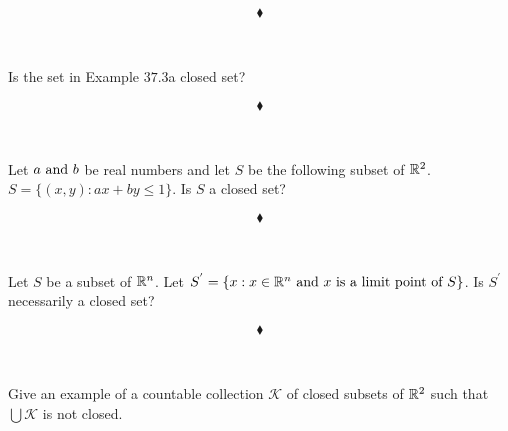 $$\blacklozenge$$\\


\subsection{}
\begin{tcolorbox}
Is the set in Example $\mathbf{37.3 }$a closed set?
\end{tcolorbox}

$$\blacklozenge$$\\


\subsection{}
\begin{tcolorbox}
Let $a \text{ and } b$ be real numbers and let $S$ be the following subset of $\mathbb{R}^2$. $ S = \{(x,y):ax + by \leq 1\}$. Is $S$ a closed set?
\end{tcolorbox}

$$\blacklozenge$$\\

\subsection{}
\begin{tcolorbox}
Let $S$ be a subset of $\mathbb{R}^n$. Let $S^{'}= \{x:x \in \mathbb{R}^n \text{ and } x \text{ is a limit point of } S\}$. Is $S^{'}$ necessarily a closed set?

\end{tcolorbox}

$$\blacklozenge$$\\

\subsection{}
\begin{tcolorbox}
Give an example of a countable collection $\mathscr{K           }$ of closed subsets of $\mathbb{R}^2$ such that $\bigcup\mathscr{K}$ is not closed.

\end{tcolorbox}

